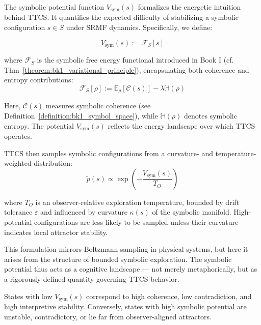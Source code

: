 \begin{scholium}
\label{scholium:bk4_symbolic_potential_energy}

The symbolic potential function \( V_{\text{sym}}(s) \) formalizes the energetic intuition behind TTCS. It quantifies the expected difficulty of stabilizing a symbolic configuration \( s \in S \) under SRMF dynamics. Specifically, we define:

\[
V_{\text{sym}}(s) := \mathcal{F}_S[s]
\]

where \( \mathcal{F}_S \) is the symbolic free energy functional introduced in Book I (cf. Thm~\ref{theorem:bk1_variational_principle}), encapsulating both coherence and entropy contributions:
\[
\mathcal{F}_S[\rho] := \mathbb{E}_\rho[\mathcal{C}(s)] - \lambda \mathbb{H}(\rho)
\]

Here, \( \mathcal{C}(s) \) measures symbolic coherence (see Definition~\ref{definition:bk1_symbol_space}), while \( \mathbb{H}(\rho) \) denotes symbolic entropy. The potential \( V_{\text{sym}}(s) \) reflects the energy landscape over which TTCS operates.

TTCS then samples symbolic configurations from a curvature- and temperature-weighted distribution:
\[
\tilde{p}(s) \propto \exp\left(-\frac{V_{\text{sym}}(s)}{T_O}\right)
\]

where \( T_O \) is an observer-relative exploration temperature, bounded by drift tolerance \( \varepsilon \) and influenced by curvature \( \kappa(s) \) of the symbolic manifold. High-potential configurations are less likely to be sampled unless their curvature indicates local attractor stability.

This formulation mirrors Boltzmann sampling in physical systems, but here it arises from the structure of bounded symbolic exploration. The symbolic potential thus acts as a cognitive landscape --- not merely metaphorically, but as a rigorously defined quantity governing TTCS behavior.

States with low \( V_{\text{sym}}(s) \) correspond to high coherence, low contradiction, and high interpretive stability. Conversely, states with high symbolic potential are unstable, contradictory, or lie far from observer-aligned attractors.

\end{scholium}


